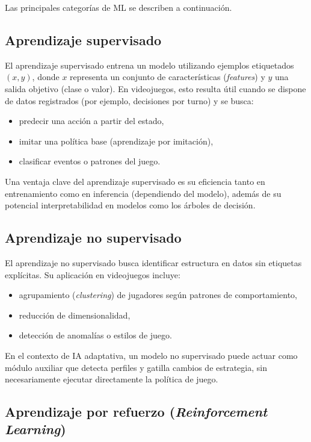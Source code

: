 Las principales categorías de ML se describen a continuación.

\subsection{Aprendizaje supervisado}

El aprendizaje supervisado entrena un modelo utilizando ejemplos etiquetados $(x, y)$, donde $x$ representa un conjunto de características (\textit{features}) y $y$ una salida objetivo (clase o valor). En videojuegos, esto resulta útil cuando se dispone de datos registrados (por ejemplo, decisiones por turno) y se busca:

\begin{itemize}
    \item predecir una acción a partir del estado,
    \item imitar una política base (aprendizaje por imitación),
    \item clasificar eventos o patrones del juego.
\end{itemize}

Una ventaja clave del aprendizaje supervisado es su eficiencia tanto en entrenamiento como en inferencia (dependiendo del modelo), además de su potencial interpretabilidad en modelos como los árboles de decisión.

\subsection{Aprendizaje no supervisado}

El aprendizaje no supervisado busca identificar estructura en datos sin etiquetas explícitas. Su aplicación en videojuegos incluye:

\begin{itemize}
    \item agrupamiento (\textit{clustering}) de jugadores según patrones de comportamiento,
    \item reducción de dimensionalidad,
    \item detección de anomalías o estilos de juego.
\end{itemize}

En el contexto de IA adaptativa, un modelo no supervisado puede actuar como módulo auxiliar que detecta perfiles y gatilla cambios de estrategia, sin necesariamente ejecutar directamente la política de juego.

\subsection{Aprendizaje por refuerzo (\textit{Reinforcement Learning})}

